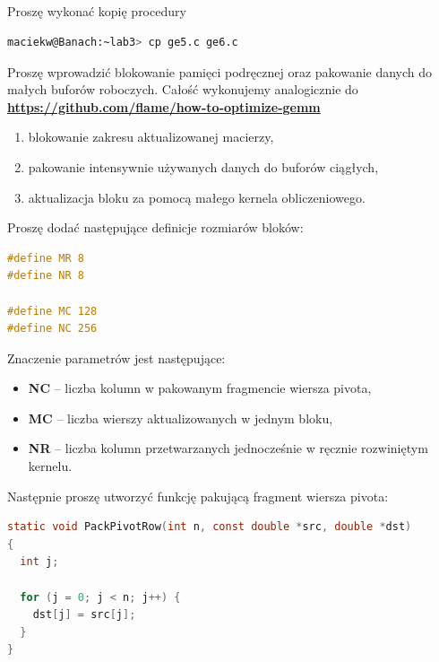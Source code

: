 \documentclass[12pt,a4paper]{article}
\begin{document}

\subsection{}

Proszę wykonać kopię procedury

\begin{lstlisting}[language=bash, frame=none, basicstyle=\small]
maciekw@Banach:~lab3> cp ge5.c ge6.c
\end{lstlisting}

Proszę wprowadzić blokowanie pamięci podręcznej oraz pakowanie danych do małych buforów roboczych.
Całość wykonujemy analogicznie do \textbf{\href{https://github.com/flame/how-to-optimize-gemm}{https://github.com/flame/how-to-optimize-gemm}}\\

\begin{enumerate}
  \item blokowanie zakresu aktualizowanej macierzy,
  \item pakowanie intensywnie używanych danych do buforów ciągłych,
  \item aktualizacja bloku za pomocą małego kernela obliczeniowego.
\end{enumerate}


Proszę dodać następujące definicje rozmiarów bloków:

\begin{lstlisting}[language=C, frame=none, basicstyle=\small]
#define MR 8
#define NR 8

#define MC 128
#define NC 256
\end{lstlisting}

Znaczenie parametrów jest następujące:

\begin{itemize}
  \item \textbf{NC} -- liczba kolumn w pakowanym fragmencie wiersza pivota,
  \item \textbf{MC} -- liczba wierszy aktualizowanych w jednym bloku,
  \item \textbf{NR} -- liczba kolumn przetwarzanych jednocześnie w ręcznie
        rozwiniętym kernelu.
\end{itemize}

Następnie proszę utworzyć funkcję pakującą fragment wiersza pivota:

\begin{lstlisting}[language=C, frame=none, basicstyle=\small]
static void PackPivotRow(int n, const double *src, double *dst)
{
  int j;

  for (j = 0; j < n; j++) {
    dst[j] = src[j];
  }
}
\end{lstlisting}
\end{document}
